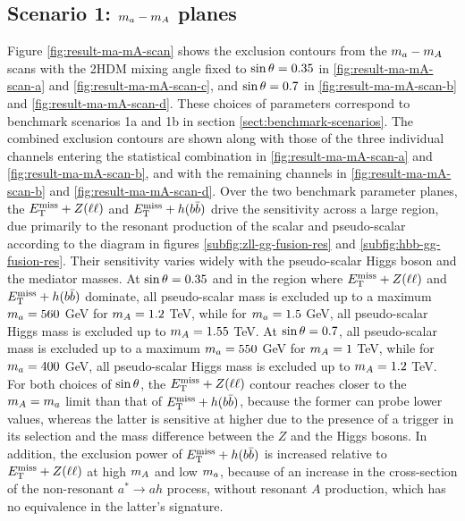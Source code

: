 \subsection{Scenario 1: \texorpdfstring{$m_a-m_A$}{TEXT} planes}
Figure \ref{fig:result-ma-mA-scan} shows the exclusion contours from the $m_a-m_A$ scans with the 2HDM mixing angle fixed to $\sin\theta=0.35$ in \ref{fig:result-ma-mA-scan-a} and \ref{fig:result-ma-mA-scan-c}, and $\sin\theta=0.7$ in \ref{fig:result-ma-mA-scan-b} and \ref{fig:result-ma-mA-scan-d}. These choices of parameters correspond to benchmark scenarios 1a and 1b in section \ref{sect:benchmark-scenarios}. The combined exclusion contours are shown along with those of the three individual channels entering the statistical combination in \ref{fig:result-ma-mA-scan-a} and \ref{fig:result-ma-mA-scan-b}, and with the remaining channels in \ref{fig:result-ma-mA-scan-b} and \ref{fig:result-ma-mA-scan-d}. Over the two benchmark parameter planes, the $E_{\mathrm{T}}^{\mathrm{miss}}+Z(\ell\ell)$ and $E_{\mathrm{T}}^{\mathrm{miss}}+h(b\bar{b})$ drive the sensitivity across a large region, due primarily to the resonant production of the scalar and pseudo-scalar according to the diagram in figures \ref{subfig:zll-gg-fusion-res} and \ref{subfig:hbb-gg-fusion-res}. Their sensitivity varies widely with the pseudo-scalar Higgs boson and the mediator masses. At $\sin\theta=0.35$ and in the region where $E_{\mathrm{T}}^{\mathrm{miss}}+Z(\ell\ell)$ and $E_{\mathrm{T}}^{\mathrm{miss}}+h(b\bar{b})$ dominate, all pseudo-scalar mass is excluded up to a maximum $m_a=560$ GeV for $m_A=1.2$ TeV, while for $m_a=1.5$ GeV, all pseudo-scalar Higgs mass is excluded up to $m_A=1.55$ TeV. At $\sin\theta=0.7$, all pseudo-scalar mass is excluded up to a maximum $m_a=550$ GeV for $m_A=1$ TeV, while for $m_a=400$ GeV, all pseudo-scalar Higgs mass is excluded up to $m_A=1.2$ TeV. For both choices of $\sin\theta$, the $E_{\mathrm{T}}^{\mathrm{miss}}+Z(\ell\ell)$ contour reaches closer to the $m_A=m_a$ limit than that of $E_{\mathrm{T}}^{\mathrm{miss}}+h(b\bar{b})$, because the former can probe lower \met values, whereas the latter is sensitive at higher \met due to the presence of a \met trigger in its selection and the mass difference between the $Z$ and the Higgs bosons. In addition, the exclusion power of $E_{\mathrm{T}}^{\mathrm{miss}}+h(b\bar{b})$ is increased relative to $E_{\mathrm{T}}^{\mathrm{miss}}+Z(\ell\ell)$ at high $m_A$ and low $m_a$, because of an increase in the cross-section of the non-resonant $a^*\rightarrow ah$ process, without resonant $A$ production, which has no equivalence in the latter's signature.


